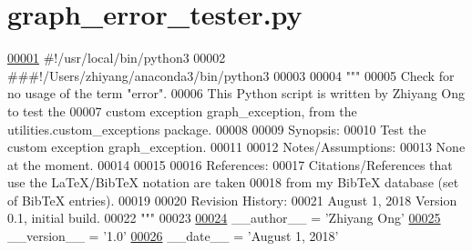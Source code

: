 \hypertarget{graph__error__tester_8py_source}{}\section{graph\+\_\+error\+\_\+tester.\+py}
\label{graph__error__tester_8py_source}

\begin{DoxyCode}
\hypertarget{graph__error__tester_8py_source_l00001}{}\hyperlink{namespaceutilities_1_1custom__exceptions_1_1graph__error__tester}{00001} \textcolor{comment}{#!/usr/local/bin/python3}
00002 \textcolor{comment}{###!/Users/zhiyang/anaconda3/bin/python3}
00003 
00004 \textcolor{stringliteral}{"""}
00005 \textcolor{stringliteral}{    Check for no usage of the term "error".}
00006 \textcolor{stringliteral}{    This Python script is written by Zhiyang Ong to test the}
00007 \textcolor{stringliteral}{        custom exception graph\_exception, from the utilities.custom\_exceptions package.}
00008 \textcolor{stringliteral}{}
00009 \textcolor{stringliteral}{    Synopsis:}
00010 \textcolor{stringliteral}{    Test the custom exception graph\_exception.}
00011 \textcolor{stringliteral}{}
00012 \textcolor{stringliteral}{    Notes/Assumptions:}
00013 \textcolor{stringliteral}{    None at the moment.}
00014 \textcolor{stringliteral}{}
00015 \textcolor{stringliteral}{}
00016 \textcolor{stringliteral}{    References:}
00017 \textcolor{stringliteral}{    Citations/References that use the LaTeX/BibTeX notation are taken}
00018 \textcolor{stringliteral}{        from my BibTeX database (set of BibTeX entries).}
00019 \textcolor{stringliteral}{}
00020 \textcolor{stringliteral}{    Revision History:}
00021 \textcolor{stringliteral}{    August 1, 2018          Version 0.1, initial build.}
00022 \textcolor{stringliteral}{"""}
00023 
\hypertarget{graph__error__tester_8py_source_l00024}{}\hyperlink{namespaceutilities_1_1custom__exceptions_1_1graph__error__tester_a3dfce4d30766c0501517e21f0f7d81c8}{00024} \_\_author\_\_ = \textcolor{stringliteral}{'Zhiyang Ong'}
\hypertarget{graph__error__tester_8py_source_l00025}{}\hyperlink{namespaceutilities_1_1custom__exceptions_1_1graph__error__tester_a0737f017d717d1aa08ae05d54ae5a491}{00025} \_\_version\_\_ = \textcolor{stringliteral}{'1.0'}
\hypertarget{graph__error__tester_8py_source_l00026}{}\hyperlink{namespaceutilities_1_1custom__exceptions_1_1graph__error__tester_aa140a2b3da93c2d18ff00df34291a231}{00026} \_\_date\_\_ = \textcolor{stringliteral}{'August 1, 2018'}

\end{DoxyCode}
